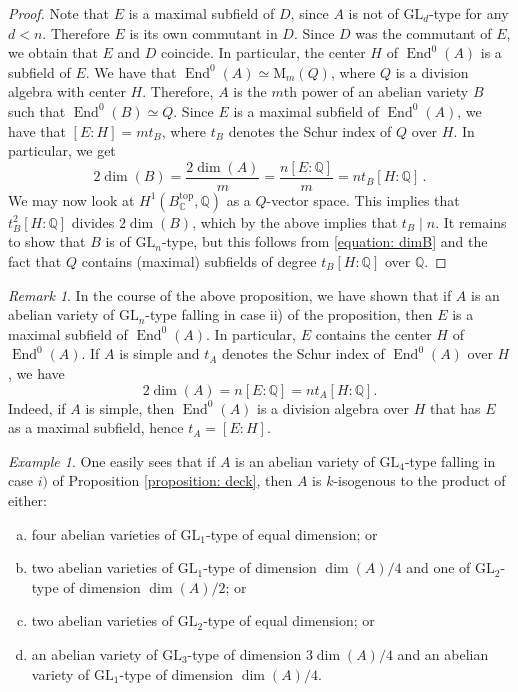 \documentclass[oneside]{amsart}
\theoremstyle{remark}
\newtheorem{remark}[theorem]{Remark}
\newtheorem{example}[theorem]{Example}
\newcommand{\Q}{\mathbb Q}
\newcommand{\C}{\mathbb C}
\newcommand{\GL}{\mathrm{GL}}
\newcommand{\M}{\mathrm{M }}
\newcommand{\End}{\operatorname{End}}
\numberwithin{equation}{section}
\begin{document}
\begin{proof}
Note that $E$ is a maximal subfield of $D$, since $A$ is not of $\GL_d$-type for any $d<n$. Therefore $E$ is its own commutant in $D$. Since $D$ was the commutant of $E$, we obtain that $E$ and $D$ coincide. In particular, the center $H$ of $\End^0 (A)$ is a subfield of $E$. We have that $\End^0(A)\simeq \M_m(Q)$, where $Q$ is a division algebra with center $H$. Therefore, $A$ is the $m$th power of an abelian variety $B$ such that $\End^0(B)\simeq Q$. Since $E$ is a maximal subfield of $\End^0(A)$, we have that $[E:H]=mt_B$, where $t_B$ denotes the Schur index of $Q$ over $H$. In particular, we get
\begin{equation}\label{equation: dimB}
2\dim(B)=\frac{2\dim(A)}{m}=\frac{n[E:\Q]}{m}={nt_B}[H:\Q]\,.
\end{equation}
We may now look at $H^1(B^{\mathrm{top}}_\C,\Q)$ as a $Q$-vector space. This implies that $t^2_B[H\colon \Q]$ divides $2\dim(B)$, which by the above implies that $t_B\mid n$.
It remains to show that $B$ is of $\GL_n$-type, but this follows from \eqref{equation: dimB} and the fact that $Q$ contains (maximal) subfields of degree $t_B[H:\Q]$ over $\Q$. 
\end{proof}

\begin{remark}\label{remark: maxfield}
In the course of the above proposition, we have shown that if $A$ is an abelian variety of $\GL_n$-type falling in case ii) of the proposition, then $E$ is a maximal subfield of $\End^0(A)$. In particular, $E$ contains the center $H$ of $\End^0(A)$. If $A$ is simple and $t_A$ denotes the Schur index of $\End^0(A)$ over $H$,  we have
$$
2\dim(A)=n[E:\Q]=nt_A[H:\Q].
$$
Indeed, if $A$ is simple, then $\End^0(A)$ is a division algebra over $H$ that has $E$ as a maximal subfield, hence $t_A=[E\colon H]$.
\end{remark}

\begin{example}\label{remark: explicitpos}
One easily sees that if $A$ is an abelian variety of $\GL_4$-type falling in case $i)$ of Proposition \ref{proposition: deck}, then $A$ is $k$-isogenous to the product of either:
\begin{enumerate}[a)]
\item four abelian varieties of $\GL_1$-type of equal dimension; or
\item two abelian varieties of $\GL_1$-type of dimension $\dim(A)/4$ and one of $\GL_2$-type of dimension $\dim(A)/2$; or  
\item two abelian varieties of $\GL_2$-type of equal dimension; or 
\item an abelian variety of $\GL_3$-type of dimension $3\dim(A)/4$ and an abelian variety of $\GL_1$-type of dimension $\dim(A)/4$. 
\end{enumerate}
\end{example}
\end{document}
